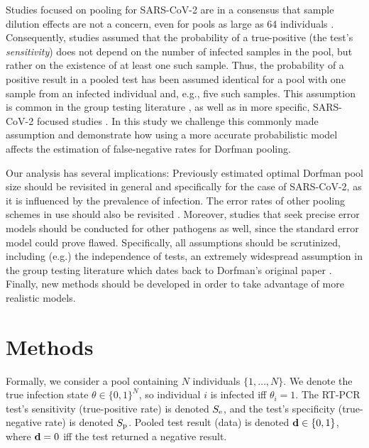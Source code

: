 \documentclass{article}
\begin{document}
Studies focused on pooling for SARS-CoV-2 are in a consensus that
sample dilution effects \cite{DilutionHIV, GroupDilution} are not a
concern, even for pools as large as 64 individuals \cite{PoolSize30,
  Lion, DorfmanYuvalDor, DilutionCOVID, CherifReview}. Consequently,
studies assumed that the probability of a true-positive (the test's
\emph{sensitivity}) does not depend on the number of infected samples
in the pool, but rather on the existence of at least one such
sample. Thus, the probability of a positive result in a pooled test
has been assumed identical for a pool with one sample from an infected
individual and, e.g., five such samples. This assumption is common in
the group testing literature \cite{Kim, OptimalDorfmanPool,
  CherifReview}, as well as in more specific, SARS-CoV-2 focused
studies \cite{Simplistic1, Simplistic2}. In this study we challenge
this commonly made assumption and demonstrate how using a more
accurate probabilistic model affects the estimation of false-negative
rates for Dorfman pooling.

Our analysis has several implications: Previously estimated optimal
Dorfman pool size \cite{OptimalDorfmanPool} should be revisited in
general and specifically for the case of SARS-CoV-2, as it is
influenced by the prevalence of infection. The error rates of other
pooling schemes in use should also be revisited \cite{BayesianDorfman,
  Kim}. Moreover, studies that seek precise error models should be
conducted for other pathogens as well, since the standard error model
could prove flawed. Specifically, all assumptions should be
scrutinized, including (e.g.) the independence of tests, an extremely
widespread assumption in the group testing literature \cite{Kim,
  OptimalDorfmanPool} which dates back to Dorfman's original paper
\cite{DorfmanOriginal}. Finally, new methods should be developed in
order to take advantage of more realistic models.

\section*{Methods}
Formally, we consider a pool containing $N$ individuals
$\{1,\dots,N\}$. We denote the true infection state $\theta \in
\{0,1\}^N$, so individual $i$ is infected iff $\theta_i=1$. The RT-PCR
test's sensitivity (true-positive rate) is denoted $S_{\text{e}}$, and the
test's specificity (true-negative rate) is denoted $S_{\text{p}}$. Pooled
test result (data) is denoted $\mathbf{d} \in \{0,1\}$, where $\mathbf{d}=0$ iff
the test returned a negative result.
\end{document}
